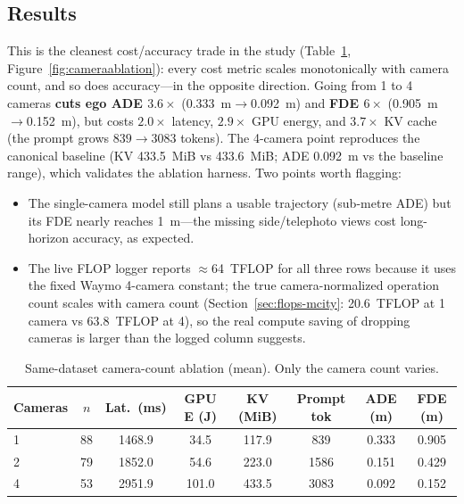 \documentclass[11pt,a4paper]{article}
\begin{document}
\subsection*{Results}
This is the cleanest cost/accuracy trade in the study
(Table~\ref{tab:cameraablation}, Figure~\ref{fig:cameraablation}): every cost
metric scales monotonically with camera count, and so does accuracy---in the
opposite direction. Going from 1 to 4 cameras \textbf{cuts ego ADE
$3.6\times$} (\SI{0.333}{\metre}$\to$\SI{0.092}{\metre}) and \textbf{FDE
$6\times$} (\SI{0.905}{\metre}$\to$\SI{0.152}{\metre}), but costs $2.0\times$
latency, $2.9\times$ GPU energy, and $3.7\times$ KV cache (the prompt grows
$839\to3083$ tokens). The 4-camera point reproduces the canonical baseline
(KV \SI{433.5}{MiB} vs \SI{433.6}{MiB}; ADE \SI{0.092}{\metre} vs the baseline
range), which validates the ablation harness. Two points worth flagging:
\begin{itemize}
  \item The single-camera model still plans a usable trajectory (sub-metre ADE)
  but its FDE nearly reaches \SI{1}{\metre}---the missing side/telephoto views
  cost long-horizon accuracy, as expected.
  \item The live FLOP logger reports $\approx$\SI{64}{TFLOP} for all three rows
  because it uses the fixed Waymo 4-camera constant; the true camera-normalized
  operation count scales with camera count (Section~\ref{sec:flops-mcity}:
  \SI{20.6}{TFLOP} at 1 camera vs \SI{63.8}{TFLOP} at 4), so the real compute
  saving of dropping cameras is larger than the logged column suggests.
\end{itemize}

\begin{table}[htbp]
\centering
\caption{Same-dataset camera-count ablation (mean). Only the camera count varies.}
\label{tab:cameraablation}
\small
\begin{tabular}{@{}lccccccc@{}}
\toprule
\textbf{Cameras} & \textbf{$n$} & \textbf{Lat.\ (ms)} & \textbf{GPU E (J)} & \textbf{KV (MiB)} & \textbf{Prompt tok} & \textbf{ADE (m)} & \textbf{FDE (m)} \\
\midrule
1 & 88 & 1468.9 & 34.5 & 117.9 & 839 & 0.333 & 0.905 \\
2 & 79 & 1852.0 & 54.6 & 223.0 & 1586 & 0.151 & 0.429 \\
4 & 53 & 2951.9 & 101.0 & 433.5 & 3083 & 0.092 & 0.152 \\
\bottomrule
\end{tabular}
\end{table}
\end{document}
